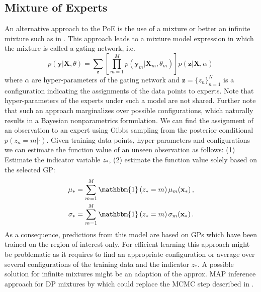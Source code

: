 \documentclass[10pt,letterpaper]{article}
\newcommand\indic[1]{\ensuremath{\mathbbm{1}\left(#1\right)}}
\newcommand{\X}{\mathbf{X}}
\newcommand{\x}{\mathbf{x}}
\newcommand{\y}{\mathbf{y}}
\newcommand{\new}{_{*}}
\theoremstyle{mystyle}
\begin{document}
\subsection{Mixture of Experts}
An alternative approach to the PoE is the use of a mixture or better an infinite mixture such as in \cite{RasmussenG2001}.
This approach leads to a mixture model expression in which the mixture is called a gating network, i.e.
\[
  p(\y | \X, \theta) = \sum_{\bm z} \left[ \prod_{m=1}^M p(\y_m | \X_m, \theta_m) \right] p(\bm z | \X, \alpha) \,
\]
where $\alpha$ are hyper-parameters of the gating network and $\bm z =\{z_n\}_{n=1}^N$ is a configuration indicating the assignments of the data points to experts.
Note that hyper-parameters of the experts under such a model are not shared.
Further note that such an approach marginalizes over possible configurations, which naturally results in a Bayesian nonparametrics formulation. 
We can find the assignment of an observation to an expert using Gibbs sampling from the posterior conditional $p(z_n = m | \cdot)$. Given training data points, hyper-parameters and configurations we can estimate the function value of an unseen observation as follows: (1) Estimate the indicator variable $z\new$, (2) estimate the function value solely based on the selected GP:
\begin{align}
  \mu\new &= \sum_{m=1}^M \indic{z\new = m} \mu_m(\x\new) \, , \\
  \sigma\new &= \sum_{m=1}^M \indic{z\new = m} \sigma_m(\x\new) \, .
\end{align}
As a consequence, predictions from this model are based on GPs which have been trained on the region of interest only.
For efficient learning this approach might be problematic as it requires to find an appropriate configuration or average over several configurations of the training data and the indicator $z\new$.
A possible solution for infinite mixtures might be an adaption of the approx. MAP inference approach for DP mixtures by \cite{Raykov2016} which could replace the MCMC step described in \cite{RasmussenG2001}.
\end{document}
